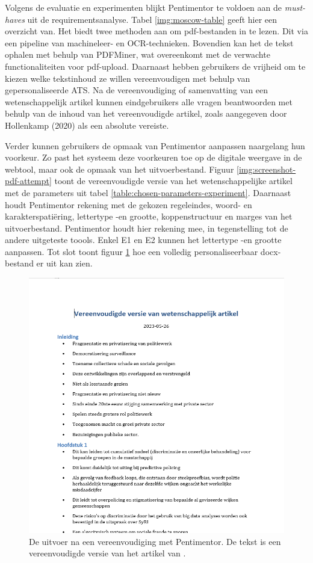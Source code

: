 Volgens de evaluatie en experimenten blijkt Pentimentor te voldoen aan de \textit{must-haves} uit de requirementsanalyse. Tabel \ref{img:moscow-table} geeft hier een overzicht van. Het biedt twee methoden aan om pdf-bestanden in te lezen. Dit via een pipeline van machineleer- en OCR-technieken. Bovendien kan het de tekst ophalen met behulp van PDFMiner, wat overeenkomt met de verwachte functionaliteiten voor pdf-upload. Daarnaast hebben gebruikers de vrijheid om te kiezen welke tekstinhoud ze willen vereenvoudigen met behulp van gepersonaliseerde ATS. Na de vereenvoudiging of samenvatting van een wetenschappelijk artikel kunnen eindgebruikers alle vragen beantwoorden met behulp van de inhoud van het vereenvoudigde artikel, zoals aangegeven door Hollenkamp (2020) als een absolute vereiste.

\medspace

Verder kunnen gebruikers de opmaak van Pentimentor aanpassen naargelang hun voorkeur. Zo past het systeem deze voorkeuren toe op de digitale weergave in de webtool, maar ook de opmaak van het uitvoerbestand. Figuur \ref{img:screenshot-pdf-attempt} toont de vereenvoudigde versie van het wetenschappelijke artikel met de parameters uit tabel \ref{table:chosen-parameters-experiment}. Daarnaast houdt Pentimentor rekening met de gekozen regeleindes, woord- en karakterspatiëring, lettertype -en grootte, koppenstructuur en marges van het uitvoerbestand. Pentimentor houdt hier rekening mee, in tegenstelling tot de andere uitgeteste toools. Enkel E1 en E2 kunnen het lettertype -en grootte aanpassen. Tot slot toont figuur \ref{img:screenshot-docx-attempt} hoe een volledig personaliseerbaar docx-bestand er uit kan zien.

\begin{figure}[H]
	\includegraphics[width=\linewidth]{img/screenshot-prototype-word.png}
	\caption{De uitvoer na een vereenvoudiging met Pentimentor. De tekst is een vereenvoudigde versie van het artikel van \textcite{VanBrakel2022}.}
	\label{img:screenshot-docx-attempt}
\end{figure}

